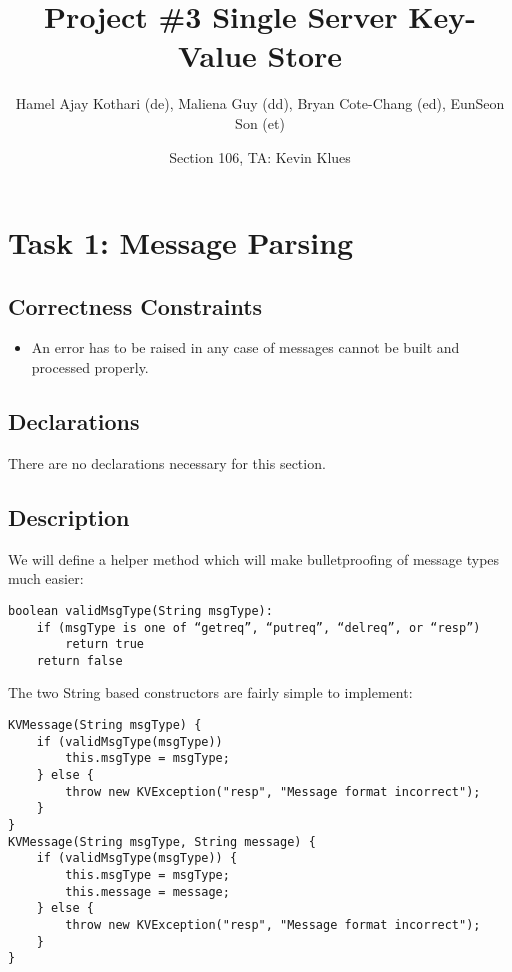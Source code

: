 \documentclass{article}
\begin{document}
\title{Project \#3 Single Server Key-Value Store} 
\author{Hamel Ajay Kothari (de), Maliena Guy (dd), Bryan Cote-Chang (ed), EunSeon Son (et)}
\date{Section 106, TA: Kevin Klues}
\maketitle

\section*{Task 1: Message Parsing}
\subsection*{Correctness Constraints}
\begin{itemize}
\item An error has to be raised in any case of messages cannot be built and processed properly.
\end{itemize}

\subsection*{Declarations}
There are no declarations necessary for this section.

\subsection*{Description}

We will define a helper method which will make bulletproofing of message types much easier:
\begin{verbatim}
boolean validMsgType(String msgType):
    if (msgType is one of “getreq”, “putreq”, “delreq”, or “resp”)
        return true
    return false
\end{verbatim}

The two String based constructors are fairly simple to implement:
\begin{verbatim}
KVMessage(String msgType) {
    if (validMsgType(msgType))
        this.msgType = msgType;
    } else {
        throw new KVException("resp", "Message format incorrect");
    }
}
KVMessage(String msgType, String message) {
    if (validMsgType(msgType)) {
        this.msgType = msgType;
        this.message = message;
    } else {
        throw new KVException("resp", "Message format incorrect");
    }
}
\end{verbatim}
\end{document}
